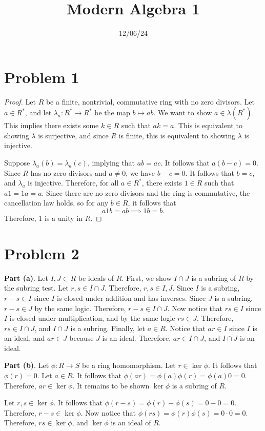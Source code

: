 \documentclass[11pt, letterpaper]{report}
\title{Modern Algebra 1}
\date{12/06/24}
\begin{document}
\makeproblem
\section*{Problem 1}
\begin{proof}
	Let $R$ be a finite, nontrivial, commutative ring with no zero divisors. Let $a\in R^*$, and let $\lambda_a : R^* \to R^*$ be the map $b\mapsto ab$. We want to show $a\in \lambda (R^*)$. This implies there exists some $k\in R$ such that $ak=a$. This is equivalent to showing $\lambda $ is surjective, and since $R$ is finite, this is equivalent to showing $\lambda $ is injective.

	Suppose $\lambda_a(b)=\lambda_a(c)$, implying that $ab=ac$. It follows that $a(b-c)=0$. Since $R$ has no zero divisors and $a\neq 0$, we have $b-c=0$. It follows that $b=c$, and  $\lambda_a $ is injective. Therefore, for all $a\in R^*$, there exists $1\in R$ such that $a1=1a=a$. Since there are no zero divisors and the ring is commutative, the cancellation law holds, so for any $b\in R$, it follows that
	\[
		a1b=ab\implies 1b=b
	.\]
	Therefore, $1$ is a unity in $R$.
\end{proof}
\section*{Problem 2}
\textbf{Part (a)}. Let $I,J\subset R$ be ideals of $R$. First, we show $I\cap J$ is a subring of $R$ by the subring test. Let $r,s\in I\cap J$. Therefore, $r,s\in I,J$. Since $I$ is a subring, $r-s\in I$ since $I$ is closed under addition and has inverses. Since $J$ is a subring, $r-s\in J$ by the same logic. Therefore, $r-s\in I\cap J$. Now notice that $rs\in I$ since $I$ is closed under multiplication,  and by the same logic $rs\in J$. Therefore, $rs\in I\cap J$, and $I\cap J$ is a subring. Finally, let $a\in R$. Notice that $ar\in I$ since $I$ is an ideal, and $ar\in J$ because $J$ is an ideal. Therefore, $ar\in I\cap J$, and $I\cap J$ is an ideal.

\noindent\textbf{Part (b)}. Let $\phi : R \to S$ be a ring homomorphism. Let $r\in \ker \phi $. It follows that $\phi (r)=0$. Let $a\in R$. It follows that $\phi (ar)=\phi (a)\phi (r)=\phi (a)0=0$. Therefore, $ar\in \ker \phi $. It remains to be shown $\ker \phi $ is a subring of $R$.

Let $r,s\in \ker \phi $. It follows that $\phi (r-s)=\phi (r)-\phi (s)=0-0=0$. Therefore, $r-s\in \ker \phi $. Now notice that $\phi (rs)=\phi (r)\phi (s)=0\cdot 0=0$. Therefore, $rs\in \ker \phi $, and $\ker \phi $ is an ideal of $R$.
\end{document}
